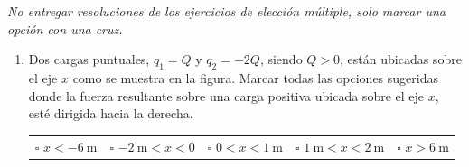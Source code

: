 \documentclass[a4paper,11pt,dvipsnames]{article}
\begin{document}


\textit{No entregar resoluciones de los ejercicios de elección múltiple, solo marcar una opción con una cruz.}

\begin{enumerate}[leftmargin=*]
\item Dos cargas puntuales, $q_1 = Q$ y $q_2 = -2Q$, siendo $Q>0$, están ubicadas sobre el eje $x$ como se muestra en la figura. Marcar todas las opciones sugeridas donde la fuerza resultante sobre una carga positiva ubicada sobre el eje $x$, esté dirigida hacia la derecha.
\begin{center}
\end{center}
\begin{tabularx}{\textwidth}{XXXXX}
$\square$ $x < \SI{-6}{\metre}$ & $\square$ $\SI{-2}{\metre} < x < 0$ & $\square$ $0 < x < \SI{1}{\metre}$ & $\square$ $\SI{1}{\metre} < x < \SI{2}{\metre}$ & $\square$ $ x > \SI{6}{\metre}$ \\
\end{tabularx}



\end{enumerate}
\end{document}
